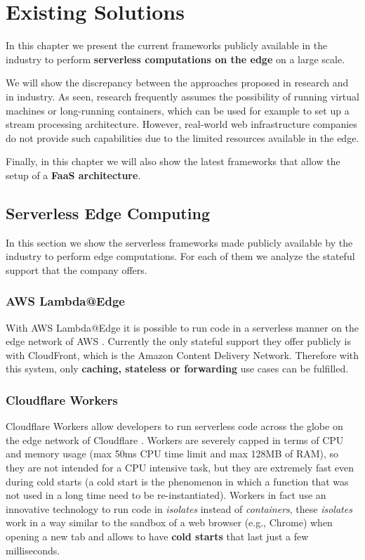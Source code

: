 \chapter{Existing Solutions}
\label{ch:existing-solutions}

In this chapter we present the current frameworks publicly available in the industry to perform \textbf{serverless computations on the edge} on a large scale.

We will show the discrepancy between the approaches proposed in research and in industry. As seen, research frequently assumes the possibility of running virtual machines or long-running containers, which can be used for example to set up a stream processing architecture. However, real-world web infrastructure companies do not provide such capabilities due to the limited resources available in the edge.

Finally, in this chapter we will also show the latest frameworks that allow the setup of a \textbf{FaaS architecture}.



\section{Serverless Edge Computing}

In this section we show the serverless frameworks made publicly available by the industry to perform edge computations. For each of them we analyze the stateful support that the company offers.


\subsection{AWS Lambda@Edge}
With AWS Lambda@Edge it is possible to run code in a serverless manner on the edge network of AWS \cite{aws-lambda-at-edge}. Currently the only stateful support they offer publicly is with CloudFront, which is the Amazon Content Delivery Network. Therefore with this system, only \textbf{caching, stateless or forwarding} use cases can be fulfilled.


\subsection{Cloudflare Workers}
Cloudflare Workers allow developers to run serverless code across the globe on the edge network of Cloudflare \cite{cloudflare-workers}. Workers are severely capped in terms of CPU and memory usage (max 50ms CPU time limit and max 128MB of RAM), so they are not intended for a CPU intensive task, but they are extremely fast even during cold starts (a cold start is the phenomenon in which a function that was not used in a long time need to be re-instantiated). Workers in fact use an innovative technology to run code in \textit{isolates} instead of \textit{containers}, these \textit{isolates} work in a way similar to the sandbox of a web browser (e.g., Chrome) when opening a new tab and allows to have \textbf{cold starts} that last just a few milliseconds.

